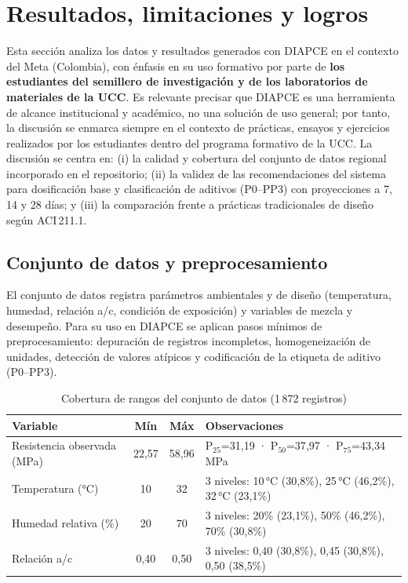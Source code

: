 \section{Resultados, limitaciones y logros}

Esta sección analiza los datos y resultados generados con DIAPCE en el contexto del Meta (Colombia), con énfasis en su uso formativo por parte de \textbf{los estudiantes del semillero de investigación y de los laboratorios de materiales de la UCC}. Es relevante precisar que DIAPCE es una herramienta de alcance institucional y académico, no una solución de uso general; por tanto, la discusión se enmarca siempre en el contexto de prácticas, ensayos y ejercicios realizados por los estudiantes dentro del programa formativo de la UCC. La discusión se centra en: (i) la calidad y cobertura del conjunto de datos regional incorporado en el repositorio; (ii) la validez de las recomendaciones del sistema para dosificación base y clasificación de aditivos (P0--PP3) con proyecciones a 7, 14 y 28 días; y (iii) la comparación frente a prácticas tradicionales de diseño según ACI\,211.1.

\subsection{Conjunto de datos y preprocesamiento}

El conjunto de datos registra parámetros ambientales y de diseño (temperatura, humedad, relación a/c, condición de exposición) y variables de mezcla y desempeño. Para su uso en DIAPCE se aplican pasos mínimos de preprocesamiento: depuración de registros incompletos, homogeneización de unidades, detección de valores atípicos y codificación de la etiqueta de aditivo (P0--PP3).

\begin{table}[H]
  \centering
  \caption{Cobertura de rangos del conjunto de datos (1\,872 registros)}
  \begin{tabular}{lccp{5.5cm}}
    \hline
    Variable & Mín & Máx & Observaciones \\
    \hline
    Resistencia observada (MPa) & 22{,}57 & 58{,}96 & P$_{25}$=31{,}19 · P$_{50}$=37{,}97 · P$_{75}$=43{,}34 MPa \\
    Temperatura (°C) & 10 & 32 & 3 niveles: 10\,°C (30{,}8\%), 25\,°C (46{,}2\%), 32\,°C (23{,}1\%) \\
    Humedad relativa (\%) & 20 & 70 & 3 niveles: 20\% (23{,}1\%), 50\% (46{,}2\%), 70\% (30{,}8\%) \\
    Relación a/c & 0{,}40 & 0{,}50 & 3 niveles: 0{,}40 (30{,}8\%), 0{,}45 (30{,}8\%), 0{,}50 (38{,}5\%) \\
    \hline
  \end{tabular}
\end{table}

